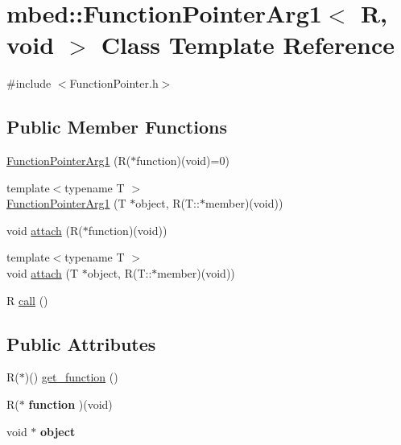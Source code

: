 \hypertarget{classmbed_1_1_function_pointer_arg1_3_01_r_00_01void_01_4}{}\section{mbed\+:\+:Function\+Pointer\+Arg1$<$ R, void $>$ Class Template Reference}
\label{classmbed_1_1_function_pointer_arg1_3_01_r_00_01void_01_4}


{\ttfamily \#include $<$Function\+Pointer.\+h$>$}

\subsection*{Public Member Functions}
\begin{DoxyCompactItemize}
\item 
\hyperlink{classmbed_1_1_function_pointer_arg1_3_01_r_00_01void_01_4_a65b6e85f8de8f88faeb9b357cb568dee}{Function\+Pointer\+Arg1} (R($\ast$function)(void)=0)
\item 
{\footnotesize template$<$typename T $>$ }\\\hyperlink{classmbed_1_1_function_pointer_arg1_3_01_r_00_01void_01_4_a8235db4bf1262037602ac60d01eaa79d}{Function\+Pointer\+Arg1} (T $\ast$object, R(T\+::$\ast$member)(void))
\item 
void \hyperlink{classmbed_1_1_function_pointer_arg1_3_01_r_00_01void_01_4_adbf8ac78db6850466a5696ced1780e74}{attach} (R($\ast$function)(void))
\item 
{\footnotesize template$<$typename T $>$ }\\void \hyperlink{classmbed_1_1_function_pointer_arg1_3_01_r_00_01void_01_4_aa01e20798796e65a264b2905b9c803b0}{attach} (T $\ast$object, R(T\+::$\ast$member)(void))
\item 
R \hyperlink{classmbed_1_1_function_pointer_arg1_3_01_r_00_01void_01_4_ae2508209ffd3a9cf4cc4e06d2fd6e7d7}{call} ()
\end{DoxyCompactItemize}
\subsection*{Public Attributes}
\begin{DoxyCompactItemize}
\item 
R($\ast$)() \hyperlink{classmbed_1_1_function_pointer_arg1_3_01_r_00_01void_01_4_a792794bb5157153b294de75f0fc6fc92}{get\+\_\+function} ()
\item 
R($\ast$ {\bfseries function} )(void)\hypertarget{classmbed_1_1_function_pointer_arg1_3_01_r_00_01void_01_4_aca5441edfa68308f6b446b56abb77fdd}{}\label{classmbed_1_1_function_pointer_arg1_3_01_r_00_01void_01_4_aca5441edfa68308f6b446b56abb77fdd}

\item 
void $\ast$ {\bfseries object}\hypertarget{classmbed_1_1_function_pointer_arg1_3_01_r_00_01void_01_4_a31306f38154e96e5a54c3a29814a0ad5}{}\label{classmbed_1_1_function_pointer_arg1_3_01_r_00_01void_01_4_a31306f38154e96e5a54c3a29814a0ad5}

\end{DoxyCompactItemize}


